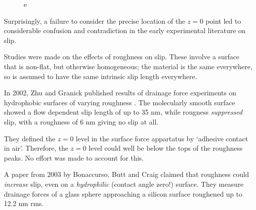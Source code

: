 \documentclass[12pt, a4paper, twoside, openright]{book}
\begin{document}
\begin{figure}[ht]
\centering
{}
\caption{e}\label{e}
\end{figure}

Surprisingly, a failure to consider the precise location of the $z=0$ point led to considerable confusion and contradiction in the early experimental literature on slip.

\vspace*{1em}

Studies were made on the effects of roughness on slip.  These involve a surface that is non-flat, but otherwise homogeneous; the material is the same everywhere, so is assumed to have the same intrinsic slip length everywhere.

\vspace*{1em}

In 2002, Zhu and Granick published results of drainage force experiments on hydrophobic surfaces of varying roughness \cite{ZhuGranick2002}.  The molecularly smooth surface showed a flow dependent slip length of up to 35 nm, while rougness \emph{suppressed} slip, with a roughness of 6 nm giving no slip at all.

They defined the $z=0$ level in the surface force appartatus by `adhesive contact in air'.  Therefore, the $z=0$ level could well be below the tops of the roughness peaks.  No effort was made to account for this.


A paper from 2003 by Bonaccurso, Butt and Craig \cite{BonaccursoButtCraig2003} claimed that roughness could \emph{increase} slip, even on a \emph{hydrophilic} (contact angle zero!) surface.
They measure drainage forces of a glass sphere approaching a silicon surface roughened up to 12.2 nm rms.
\end{document}

